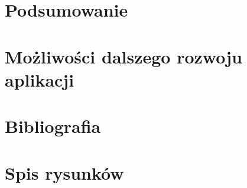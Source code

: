 \documentclass[12pt]{article}
\begin{document}
\begin{sloppypar}
{}

\section{Podsumowanie}
{

}

\section{Możliwości dalszego rozwoju aplikacji}
{

}

\section{Bibliografia}
{
  \printbibliography
}

\section{Spis rysunków}
{

}

\end{sloppypar}
\end{document}
